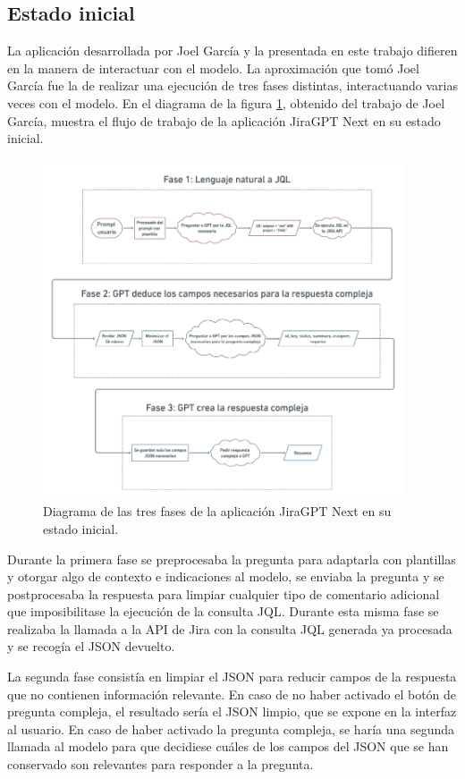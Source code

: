 \subsection{Estado inicial}
La aplicación desarrollada por Joel García y la presentada en este trabajo difieren en la manera de interactuar con el modelo. La aproximación que tomó Joel García fue la de realizar una ejecución de tres fases distintas, interactuando varias veces con el modelo. En el diagrama de la figura \ref{fig:diagrama_joel}, obtenido del trabajo de Joel García\cite{jiragpt}, muestra el flujo de trabajo de la aplicación JiraGPT Next en su estado inicial.

\begin{figure}[H]
    \centering
    \includegraphics[width=0.95\textwidth]{images/diagrama_joel.png}
    \caption{Diagrama de las tres fases de la aplicación JiraGPT Next en su estado inicial.}\label{fig:diagrama_joel}
\end{figure}

Durante la primera fase se preprocesaba la pregunta para adaptarla con plantillas y otorgar algo de contexto e indicaciones al modelo, se enviaba la pregunta y se postprocesaba la respuesta para limpiar cualquier tipo de comentario adicional que imposibilitase la ejecución de la consulta JQL. Durante esta misma fase se realizaba la llamada a la API de Jira con la consulta JQL generada ya procesada y se recogía el JSON devuelto.

La segunda fase consistía en limpiar el JSON para reducir campos de la respuesta que no contienen información relevante. En caso de no haber activado el botón de pregunta compleja, el resultado sería el JSON limpio, que se expone en la interfaz al usuario. En caso de haber activado la pregunta compleja, se haría una segunda llamada al modelo para que decidiese cuáles de los campos del JSON que se han conservado son relevantes para responder a la pregunta.

